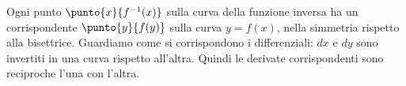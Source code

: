 \begin{inaccessibleblock}
 \begin{center}
 \begin{minipage}[]{.55\textwidth}
  \diffinversa
 \end{minipage} 
  \hfill
 \begin{minipage}[]{.42\textwidth}
Ogni punto $\punto{x}{f^{-1}(x)}$ sulla curva della funzione inversa ha un
corrispondente $\punto{y}{f(y)}$ sulla curva $y=f(x)$, nella simmetria 
rispetto
alla bisettrice. Guardiamo come si corrispondono i differenziali:
$dx$ e $dy$ sono invertiti in una curva rispetto all'altra. Quindi le 
derivate corrispondenti sono reciproche l'una con l'altra.
 \end{minipage}
 \end{center}
\end{inaccessibleblock}
\label{}

